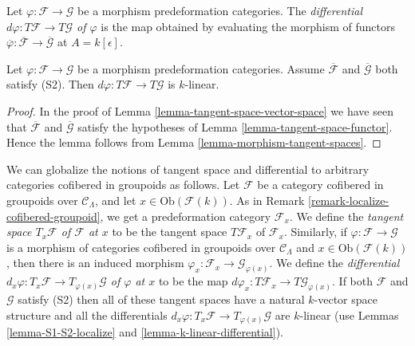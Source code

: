 \begin{definition}
\label{definition-differential}
Let $\varphi: \mathcal{F} \to \mathcal{G}$ be a morphism predeformation 
categories. The
{\it differential $d \varphi: T \mathcal{F} \to T \mathcal{G}$ of $\varphi$}
is the map obtained by evaluating the morphism of functors
$\overline{\varphi}: \overline{\mathcal{F}} \to \overline{\mathcal{G}}$
at $A = k[\epsilon]$.
\end{definition}

\begin{lemma}
\label{lemma-k-linear-differential}
Let $\varphi: \mathcal{F} \to \mathcal{G}$ be a morphism predeformation 
categories. Assume $\overline{\mathcal{F}}$ and $\overline{\mathcal{G}}$ both 
satisfy (S2). Then $d \varphi: T \mathcal{F} \to T \mathcal{G}$ is $k$-linear.
\end{lemma}

\begin{proof}
In the proof of
Lemma \ref{lemma-tangent-space-vector-space}
we have seen that $\overline{\mathcal{F}}$ and $\overline{\mathcal{G}}$
satisfy the hypotheses of
Lemma \ref{lemma-tangent-space-functor}.
Hence the lemma follows from
Lemma \ref{lemma-morphism-tangent-spaces}.
\end{proof}

\begin{remark}
\label{remark-tangent-space-cofibered-groupoid}
We can globalize the notions of tangent space and differential to arbitrary 
categories cofibered in groupoids as follows. Let $\mathcal{F}$ be a category 
cofibered in groupoids over $\mathcal{C}_\Lambda$, and let
$x \in \text{Ob}(\mathcal{F}(k))$. As in
Remark \ref{remark-localize-cofibered-groupoid},
we get a predeformation category $\mathcal{F}_x$. We define the
{\it tangent space $T_x \mathcal{F}$ of $\mathcal{F}$ at $x$}
to be the tangent space $T \mathcal{F}_x$ of
$\mathcal{F}_x$. Similarly, if
$\varphi: \mathcal{F} \to \mathcal{G}$ is a morphism of categories cofibered
in groupoids over $\mathcal{C}_\Lambda$ and $x \in \text{Ob}(\mathcal{F}(k))$,
then there is an induced morphism
$\varphi_x: \mathcal{F}_x \to \mathcal{G}_{\varphi(x)}$. We define the 
{\it differential
$d_{x} \varphi: T_{x} \mathcal{F} \to T_{\varphi(x)} \mathcal{G}$
of $\varphi$ at $x$} to be the map
$d \varphi_x: T \mathcal{F}_x \to T \mathcal{G}_{\varphi(x)}$.
If both $\mathcal{F}$ and $\mathcal{G}$ satisfy (S2) then
all of these tangent spaces have a natural $k$-vector space structure
and all the differentials
$d_{x} \varphi: T_{x} \mathcal{F} \to T_{\varphi(x)} \mathcal{G}$
are $k$-linear (use
Lemmas \ref{lemma-S1-S2-localize} and \ref{lemma-k-linear-differential}).
\end{remark}

